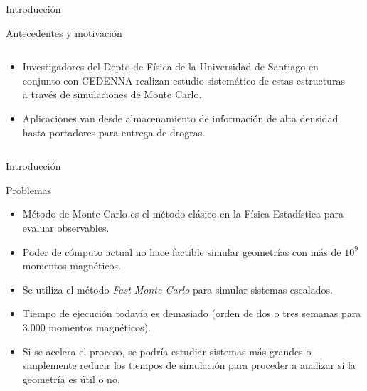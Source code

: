 \begin{frame}{Introducción}
\begin{block}{Antecedentes y motivación}

\begin{columns}

  \begin{column}{.65\textwidth}
\begin{itemize}
  \item Investigadores del Depto de Física de la Universidad de Santiago en conjunto con CEDENNA realizan estudio sistemático de estas estructuras a través de simulaciones de Monte Carlo.
  \item Aplicaciones van desde almacenamiento de información de alta densidad hasta portadores para entrega de drogras.
\end{itemize}
  \end{column}
  
  \begin{column}{.35\textwidth}
\centerline{}
  \end{column}
  
\end{columns}

\end{block}
\end{frame}

\begin{frame}{Introducción}
\begin{block}{Problemas}
\begin{itemize}
  \item Método de Monte Carlo es el método clásico en la Física Estadística para evaluar observables.
  \item Poder de cómputo actual no hace factible simular geometrías con más de $10^{9}$ momentos magnéticos.
  \item Se utiliza el método \textit{Fast Monte Carlo} para simular sistemas escalados.
  \item Tiempo de ejecución todavía es demasiado (orden de dos o tres semanas para 3.000 momentos magnéticos).
  \item Si se acelera el proceso, se podría estudiar sistemas más grandes o simplemente reducir los tiempos de simulación para proceder a analizar si la geometría es útil o no.
\end{itemize}
\end{block}
\end{frame}

